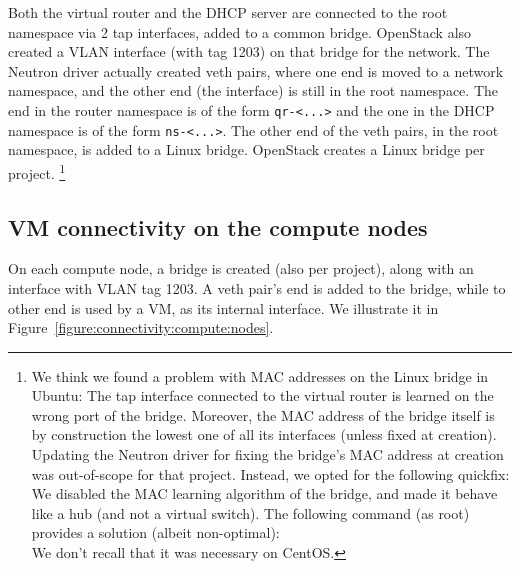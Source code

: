 
Both the virtual router and the DHCP server are connected to the root
namespace via 2 tap interfaces, added to a common bridge. OpenStack
also created a VLAN interface (with tag 1203) on that bridge for the
 network.
%
The Neutron driver actually created veth pairs, where one end is moved
to a network namespace, and the other end (the 
interface) is still in the root namespace. The end in the router
namespace is of the form \texttt{qr-\textless{}...\textgreater{}} and
the one in the DHCP namespace is of the form
\texttt{ns-\textless{}...\textgreater{}}. The other end of the veth
pairs, in the root namespace, is added to a Linux bridge. OpenStack
creates a Linux bridge per project.%
\footnote{%
  We think we found a problem with MAC addresses on the Linux bridge
  in Ubuntu: The tap interface connected to the virtual router is
  learned on the wrong port of the bridge. Moreover, the MAC address
  of the bridge itself is by construction the lowest one of all its
  interfaces (unless fixed at creation). Updating the Neutron driver
  for fixing the bridge's MAC address at creation was out-of-scope for
  that project. Instead, we opted for the following quickfix: We
  disabled the MAC learning algorithm of the bridge, and made it
  behave like a hub (and not a virtual switch).
  The following command (as root) provides a solution (albeit
  non-optimal): 
  \\
  \noindent%
  We don't recall that it was necessary on CentOS. 
}
%



\subsection{VM connectivity on the compute nodes}
\label{section:implementation:compute:nodes}

On each compute node, a bridge is created (also per project), along
with an interface with VLAN tag 1203. A veth pair's end is added to
the bridge, while to other end is used by a VM, as its internal
interface. We illustrate it in
Figure~\ref{figure:connectivity:compute:nodes}.

